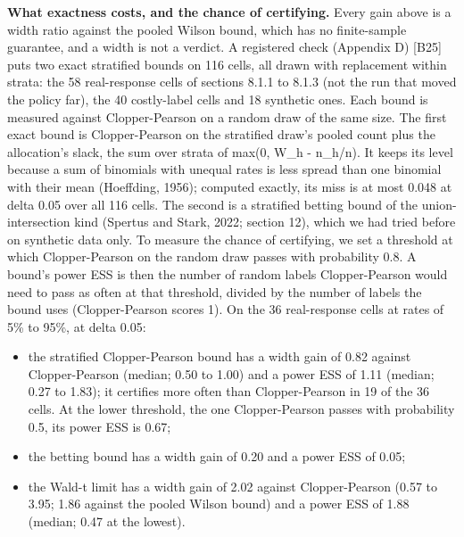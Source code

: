 \documentclass[11pt]{article}
\begin{document}
\textbf{What exactness costs, and the chance of certifying.} Every gain above is a width ratio against the pooled Wilson bound, which has no finite-sample guarantee, and a width is not a verdict. A registered check (Appendix D) [B25] puts two exact stratified bounds on 116 cells, all drawn with replacement within strata: the 58 real-response cells of sections 8.1.1 to 8.1.3 (not the run that moved the policy far), the 40 costly-label cells and 18 synthetic ones. Each bound is measured against Clopper-Pearson on a random draw of the same size. The first exact bound is Clopper-Pearson on the stratified draw's pooled count plus the allocation's slack, the sum over strata of max(0, W\_h - n\_h/n). It keeps its level because a sum of binomials with unequal rates is less spread than one binomial with their mean (Hoeffding, 1956); computed exactly, its miss is at most 0.048 at delta 0.05 over all 116 cells. The second is a stratified betting bound of the union-intersection kind (Spertus and Stark, 2022; section 12), which we had tried before on synthetic data only. To measure the chance of certifying, we set a threshold at which Clopper-Pearson on the random draw passes with probability 0.8. A bound's power ESS is then the number of random labels Clopper-Pearson would need to pass as often at that threshold, divided by the number of labels the bound uses (Clopper-Pearson scores 1). On the 36 real-response cells at rates of 5\% to 95\%, at delta 0.05:


\begin{itemize}
\item the stratified Clopper-Pearson bound has a width gain of 0.82 against Clopper-Pearson (median; 0.50 to 1.00) and a power ESS of 1.11 (median; 0.27 to 1.83); it certifies more often than Clopper-Pearson in 19 of the 36 cells. At the lower threshold, the one Clopper-Pearson passes with probability 0.5, its power ESS is 0.67;
\item the betting bound has a width gain of 0.20 and a power ESS of 0.05;
\item the Wald-t limit has a width gain of 2.02 against Clopper-Pearson (0.57 to 3.95; 1.86 against the pooled Wilson bound) and a power ESS of 1.88 (median; 0.47 at the lowest).
\end{itemize}
\end{document}
